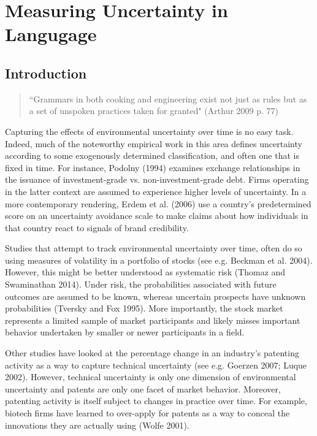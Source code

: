 \chapter{Measuring Uncertainty in Langugage\label{lang}}

\section{Introduction}

\begin{small}
\begin{quote}
``Grammars in both cooking and engineering exist not just as rules but as a set of unspoken practices taken for granted" (Arthur 2009 p. 77)
\end{quote}
\end{small}

Capturing the effects of environmental uncertainty over time is no easy task. Indeed, much of the noteworthy empirical work in this area defines uncertainty according to some exogenously determined classification, and often one that is fixed in time. For instance, Podolny (1994) examines exchange relationships in the issuance of investment-grade vs. non-investment-grade debt. Firms operating in the latter context are assumed to experience higher levels of uncertainty. In a more contemporary rendering, Erdem et al. (2006) use a country's predetermined score on an uncertainty avoidance scale to make claims about how individuals in that country react to signals of brand credibility. 

Studies that attempt to track environmental uncertainty over time, often do so using measures of volatility in a portfolio of stocks (see e.g. Beckman et al. 2004). However, this might be better understood as systematic risk (Thomaz and Swaminathan 2014). Under risk, the probabilities associated with future outcomes are assumed to be known, whereas uncertain prospects have unknown probabilities (Tversky and Fox 1995). More importantly, the stock market represents a limited sample of market participants and likely misses important behavior undertaken by smaller or newer participants in a field. 

Other studies have looked at the percentage change in an industry's patenting activity as a way to capture technical uncertainty (see e.g. Goerzen 2007; Luque 2002). However, technical uncertainty is only one dimension of environmental uncertainty and patents are only one facet of market behavior. Moreover, patenting activity is itself subject to changes in practice over time. For example, biotech firms have learned to over-apply for patents as a way to conceal the innovations they are actually using (Wolfe 2001).

